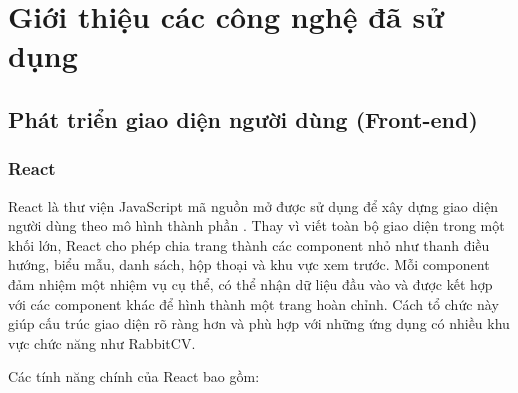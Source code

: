 \chapter{Giới thiệu các công nghệ đã sử dụng}
\label{chap:used-technologies}


\section{Phát triển giao diện người dùng (Front-end)}

\subsection{React}

React là thư viện JavaScript mã nguồn mở được sử dụng để xây dựng giao diện người dùng theo mô hình thành phần \cite{reactdocs}. Thay vì viết toàn bộ giao diện trong một khối lớn, React cho phép chia trang thành các component nhỏ như thanh điều hướng, biểu mẫu, danh sách, hộp thoại và khu vực xem trước. Mỗi component đảm nhiệm một nhiệm vụ cụ thể, có thể nhận dữ liệu đầu vào và được kết hợp với các component khác để hình thành một trang hoàn chỉnh. Cách tổ chức này giúp cấu trúc giao diện rõ ràng hơn và phù hợp với những ứng dụng có nhiều khu vực chức năng như RabbitCV.

Các tính năng chính của React bao gồm:

